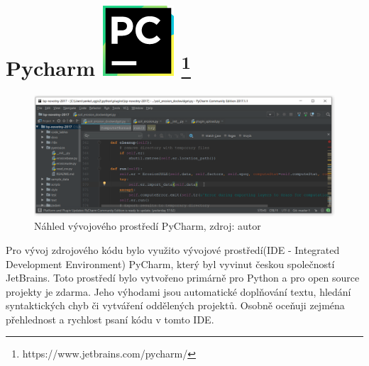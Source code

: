 \section[PyCharm]{Pycharm \includegraphics[scale=0.2]
{./pictures/pycharm.png} \footnote{https://www.jetbrains.com/pycharm/}}
\label{python}
\vspace{-10pt}
\begin{figure}[H]
    \centering \includegraphics[scale=0.45]{./pictures/pycharm_screen.png}
      \caption[Náhled vývojového prostředí PyCharm]{Náhled vývojového 
      prostředí PyCharm, zdroj: autor}
      \label{screen:pycharm}
\end{figure}
\vspace{-10pt}
Pro vývoj zdrojového kódu bylo využito vývojové prostředí(IDE - 
Integrated Development Environment)  PyCharm, který byl vyvinut 
českou společností JetBrains. Toto prostředí bylo vytvořeno primárně 
pro Python a pro open source projekty je zdarma. Jeho výhodami jsou 
automatické doplňování textu, hledání syntaktických chyb či vytváření 
oddělených projektů. Osobně oceňuji zejména přehlednost a rychlost 
psaní kódu v tomto IDE.\cite{masteringPycharm}
